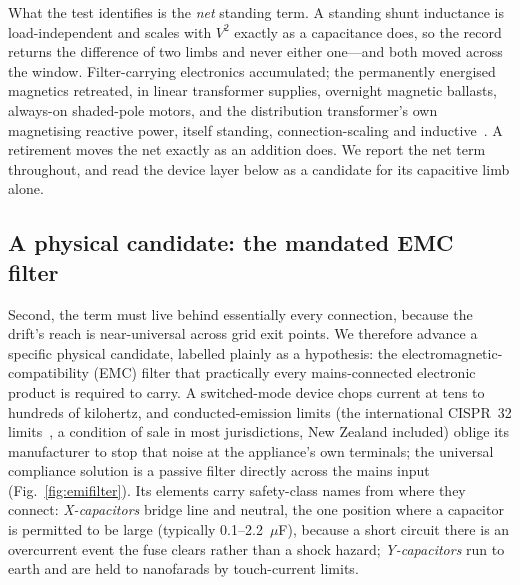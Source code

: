 \documentclass[journal]{IEEEtran}
\begin{document}
What the test identifies is the \emph{net} standing term. A standing shunt
inductance is load-independent and scales with $V^2$ exactly as a capacitance does,
so the record returns the difference of two limbs and never either one---and both
moved across the window. Filter-carrying electronics accumulated; the permanently
energised magnetics retreated, in linear transformer supplies, overnight magnetic
ballasts, always-on shaded-pole motors, and the distribution transformer's own
magnetising reactive power, itself standing, connection-scaling and
inductive~\cite{hume_extended}. A retirement moves the net exactly as an addition
does. We report the net term throughout, and read the device layer below as a
candidate for its capacitive limb alone.

\subsection{A physical candidate: the mandated EMC filter}
Second, the term must live behind essentially every connection, because
the drift's reach is near-universal across grid exit points. We therefore advance
a specific physical candidate, labelled plainly as a hypothesis: the
electromagnetic-compatibility (EMC) filter that practically every mains-connected
electronic product is required to carry. A switched-mode device chops current at
tens to hundreds of kilohertz, and conducted-emission limits (the international CISPR~32 limits~\cite{cispr32}, a condition of sale in most jurisdictions, New
Zealand included) oblige its manufacturer to stop that noise at the appliance's
own terminals; the universal compliance solution is a passive filter directly
across the mains input (Fig.~\ref{fig:emifilter}). Its elements carry safety-class
names from where they connect: \emph{X-capacitors} bridge line
and neutral, the one position where a capacitor is permitted to be large
(typically 0.1--2.2~$\mu$F), because a short circuit there is an overcurrent
event the fuse clears rather than a shock hazard; \emph{Y-capacitors} run to
earth and are held to nanofarads by touch-current limits.
\end{document}
